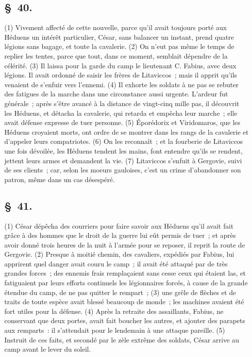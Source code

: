 \documentclass[french,twoside]{book} %
\begin{document}
\subsection[{§ 40.}]{ \textsc{§ 40.} }
\noindent (1) Vivement affecté de cette nouvelle, parce qu’il avait toujours porté aux Héduens un intérêt particulier, César, sans balancer un instant, prend quatre légions sans bagage, et toute la cavalerie. (2) On n’eut pas même le temps de replier les tentes, parce que tout, dans ce moment, semblait dépendre de la célérité. (3) Il laissa pour la garde du camp le lieutenant C. Fabius, avec deux légions. Il avait ordonné de saisir les frères de Litaviccos ; mais il apprit qu’ils venaient de s’enfuir vers l’ennemi. (4) Il exhorte les soldats à ne pas se rebuter des fatigues de la marche dans une circonstance aussi urgente. L'ardeur fut générale ; après s’être avancé à la distance de vingt-cinq mille pas, il découvrit les Héduens, et détacha la cavalerie, qui retarda et empêcha leur marche ; elle avait défense expresse de tuer personne. (5) Éporédorix et Viridomaros, que les Héduens croyaient morts, ont ordre de se montrer dans les rangs de la cavalerie et d’appeler leurs compatriotes. (6) On les reconnaît ; et la fourberie de Litaviccos une fois dévoilée, les Héduens tendent les mains, font entendre qu’ils se rendent, jettent leurs armes et demandent la vie. (7) Litaviccos s’enfuit à Gergovie, suivi de ses clients ; car, selon les moeurs gauloises, c’est un crime d’abandonner son patron, même dans un cas désespéré.
\subsection[{§ 41.}]{ \textsc{§ 41.} }
\noindent (1) César dépêcha des courriers pour faire savoir aux Héduens qu’il avait fait grâce à des hommes que le droit de la guerre lui eût permis de tuer ; et après avoir donné trois heures de la nuit à l’armée pour se reposer, il reprit la route de Gergovie. (2) Presque à moitié chemin, des cavaliers, expédiés par Fabius, lui apprirent quel danger avait couru le camp ; il avait été attaqué par de très grandes forces ; des ennemis frais remplaçaient sans cesse ceux qui étaient las, et fatiguaient par leurs efforts continuels les légionnaires forcés, à cause de la grande étendue du camp, de ne pas quitter le rempart ; (3) une grêle de flèches et de traits de toute espèce avait blessé beaucoup de monde ; les machines avaient été fort utiles pour la défense. (4) Après la retraite des assaillants, Fabius, ne conservant que deux portes, avait fait boucher les autres, et ajouter des parapets aux remparts : il s’attendait pour le lendemain à une attaque pareille. (5) Instruit de ces faits, et secondé par le zèle extrême des soldats, César arrive au camp avant le lever du soleil.
\end{document}
